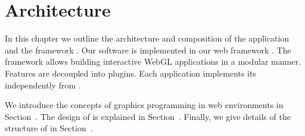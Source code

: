 \documentclass[../ClassicThesis.tex]{subfiles}
\begin{document}
\chapter{Architecture}
\label{ch:architecture}

In this chapter we outline the architecture and composition of the
application {\platener} and the framework {\convertify}. Our software
{\platener} is implemented in our web framework {\convertify}. The
framework allows building interactive WebGL applications in a modular
manner. Features are decoupled into plugins. Each application
implements its {\userinterface} independently from {\convertify}.

We introduce the concepts of graphics programming in web
environments in Section~. The design of {\convertify}
is explained in Section~. Finally, we
give details of the structure of {\platener} in
Section~.








\end{document}
